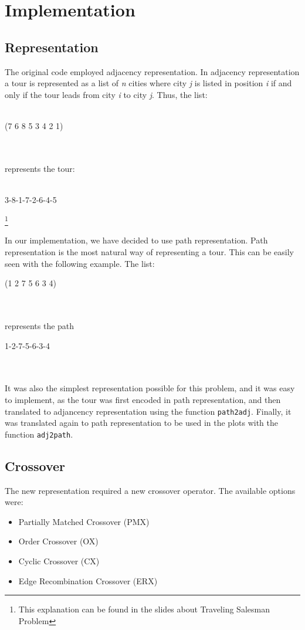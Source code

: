 \section{Implementation}

\subsection{Representation}
The original code employed adjacency representation. In adjacency representation a tour is represented as a list of \textit{n} cities where city \textit{j} is listed in position \textit{i} if and only if the tour leads from city \textit{i} to city \textit{j}. Thus, the list:\\
\\
\centerline{(7 6 8 5 3 4 2 1)}\\
\\
represents the tour:\\ 
\\
\centerline{3-8-1-7-2-6-4-5}\footnote{This explanation can be found in the slides about Traveling Salesman Problem}\\
\\ 
In our implementation, we have decided to use path representation. Path representation is the most natural way of representing a tour. This can be easily seen with the following example. The list:
\\
\centerline{(1 2 7 5 6 3 4)}\\
\\
represents the path\\
\centerline{1-2-7-5-6-3-4}\\
\\
It was also the simplest representation possible for this problem, and it was easy to implement, as the tour was first encoded in path representation, and then translated to adjancency representation using the function \texttt{path2adj}. Finally, it was translated again to path representation to be used in the plots with the function \texttt{adj2path}. 

\subsection{Crossover}
  The new representation required a new crossover operator. The available options were:
  \begin{itemize}
  	\item Partially Matched Crossover (PMX)
  	\item Order Crossover (OX)
  	\item Cyclic Crossover (CX)
  	\item Edge Recombination Crossover (ERX)
  \end{itemize}


